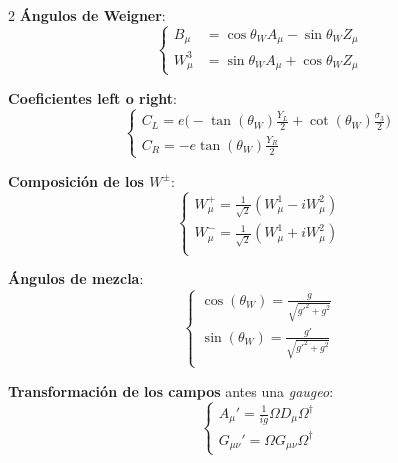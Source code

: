 \documentclass[12pt]{article}
\begin{document}
\begin{multicols}{2}
        \textbf{Ángulos de Weigner}:
        \begin{equation*}
            \begin{cases}
                B_{\mu} &= \cos \theta_{W}A_{\mu} - \sin \theta_{W}Z_{\mu} \\
                W_{\mu}^{3} &= \sin \theta_{W}A_{\mu} + \cos \theta_{W}Z_{\mu}
            \end{cases}
        \end{equation*}

        \textbf{Coeficientes left o right}:
        \begin{equation*}
            \begin{cases}
                C_L = e\bigg(-\tan{(\theta_W)\frac{Y_{L}}{2}} + \cot(\theta_{W})\frac{\sigma_3}{2}\bigg) \\
                C_R = -e\tan(\theta_W)\frac{Y_R}{2}
            \end{cases}
        \end{equation*}

        \textbf{Composición de los $W^{\pm}$}:
        \begin{equation*}
            \begin{cases}
                W_{\mu}^{+} = \frac{1}{\sqrt{2}} (W_{\mu}^{1} - iW_{\mu}^{2}) \\
                W_{\mu}^{-} = \frac{1}{\sqrt{2}} (W_{\mu}^{1} + iW_{\mu}^{2}) \\
            \end{cases}
        \end{equation*}

        \textbf{Ángulos de mezcla}:
        \begin{equation*}
            \begin{cases}
                \cos(\theta_{W}) = \frac{g}{\sqrt{g'^{2} + g^{2}}} \\
                \sin(\theta_{W}) = \frac{g'}{\sqrt{g'^{2} + g^{2}}} \\
            \end{cases}
        \end{equation*}

        \textbf{Transformación de los campos} antes una \textit{gaugeo}:
        \begin{equation*}
            \begin{cases}
                A_{\mu}' = \frac{1}{ig}\Omega D_\mu \Omega^{\dagger} \\
                G_{\mu\nu}' = \Omega G_{\mu\nu} \Omega^{\dagger}
            \end{cases}
        \end{equation*}


\end{multicols}
\end{document}
